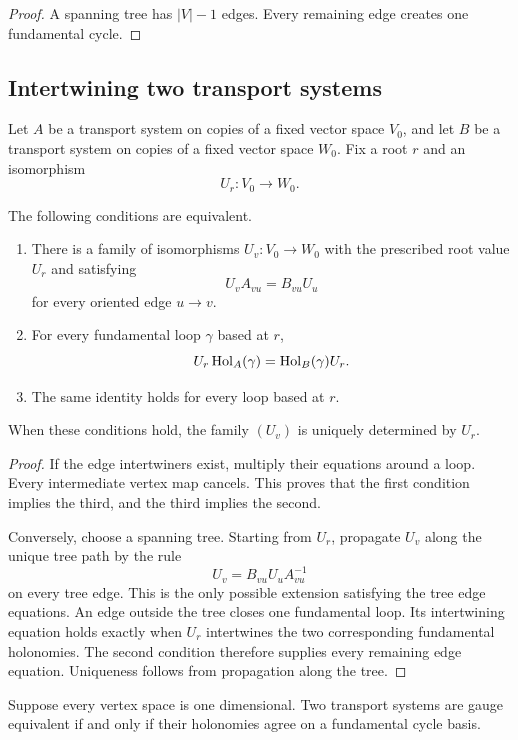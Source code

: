 \begin{proof}
A spanning tree has $|V|-1$ edges.  Every remaining edge creates one fundamental cycle.
\end{proof}


\subsection{Intertwining two transport systems}

Let $A$ be a transport system on copies of a fixed vector space $V_0$, and let $B$ be a transport system on copies of a fixed vector space $W_0$.  Fix a root $r$ and an isomorphism
\[
U_r:V_0\longrightarrow W_0.
\]

\begin{theorem}\label{thm:holonomy_intertwining}
The following conditions are equivalent.
\begin{enumerate}
\item There is a family of isomorphisms $U_v:V_0\to W_0$ with the prescribed root value $U_r$ and satisfying
\[
U_vA_{vu}=B_{vu}U_u
\]
for every oriented edge $u\to v$.
\item For every fundamental loop $\gamma$ based at $r$,
\[
U_r\operatorname{Hol}_A(\gamma)=\operatorname{Hol}_B(\gamma)U_r.
\]
\item The same identity holds for every loop based at $r$.
\end{enumerate}
When these conditions hold, the family $(U_v)$ is uniquely determined by $U_r$.
\end{theorem}

\begin{proof}
If the edge intertwiners exist, multiply their equations around a loop.  Every intermediate vertex map cancels.  This proves that the first condition implies the third, and the third implies the second.

Conversely, choose a spanning tree.  Starting from $U_r$, propagate $U_v$ along the unique tree path by the rule
\[
U_v=B_{vu}U_uA_{vu}^{-1}
\]
on every tree edge.  This is the only possible extension satisfying the tree edge equations.  An edge outside the tree closes one fundamental loop.  Its intertwining equation holds exactly when $U_r$ intertwines the two corresponding fundamental holonomies.  The second condition therefore supplies every remaining edge equation.  Uniqueness follows from propagation along the tree.
\end{proof}

\begin{corollary}\label{cor:scalar_holonomy_bridge}
Suppose every vertex space is one dimensional.  Two transport systems are gauge equivalent if and only if their holonomies agree on a fundamental cycle basis.
\end{corollary}

